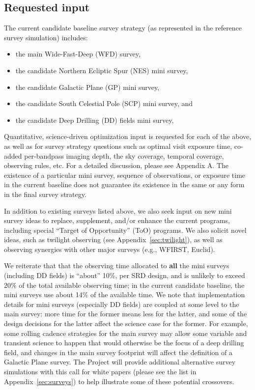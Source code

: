 \documentclass[DM,lsstdraft,toc,usenatbib]{lsstdoc}
\begin{document}
\subsection{Requested input \label{sec:reqinput}}

The current candidate baseline survey strategy (as represented in the reference survey simulation) includes:
\begin{itemize}
\item the main Wide-Fast-Deep (WFD) survey,
\item the candidate Northern Ecliptic Spur (NES) mini survey, 
\item the candidate Galactic Plane (GP) mini survey,
\item the candidate South Celestial Pole (SCP) mini survey, and
\item the candidate Deep Drilling (DD) fields mini survey,
\end{itemize}
Quantitative, science-driven optimization input is requested for each of the above, as well as 
for survey strategy questions such as optimal visit exposure time,
co-added per-bandpass imaging depth, the sky coverage, temporal coverage, observing
rules, etc.  For a detailed discussion, please see Appendix A. The existence of a particular
mini survey, sequence of observations, or exposure time in the current baseline does not 
guarantee its existence in the same or any form in the final survey strategy. 

In addition to existing surveys listed above, we also seek input on new mini survey ideas 
to replace, supplement, and/or enhance the current programs, including special ``Target of Opportunity'' (ToO) 
programs. We also solicit novel ideas, such as twilight observing (see Appendix~\ref{sec:twilight}),
as well as observing synergies with other major surveys (e.g., WFIRST, Euclid). 

We reiterate that that the observing time allocated to {\bf all} the mini surveys 
(including DD fields) is ``about'' 10\%, per SRD design, and is unlikely to exceed 20\% of the total available
observing time; in the current candidate baseline, the mini surveys use about 14\% of the available time. 
We note that implementation details for mini surveys (especially DD fields)
are coupled at some level to the main survey: more time for the former means less 
for the latter, and some of the design decisions for the latter affect the science
case for the former.  For example, some rolling cadence strategies for the main survey  
may allow some variable and transient science to happen that would otherwise be the 
focus of a deep drilling field, and changes in the main survey footprint will affect the 
definition of a Galactic Plane survey. The Project will provide additional alternative 
survey simulations with this call for white papers (please see the list in Appendix~\ref{sec:surveys}) 
to help illustrate some of these potential crossovers. 
\end{document}
